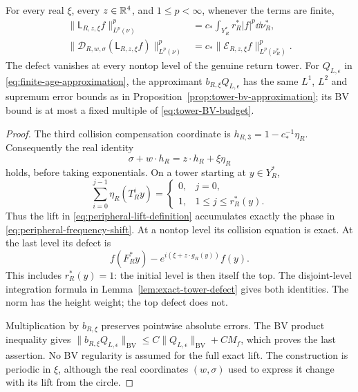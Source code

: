 \begin{lemma}
\label{lem:exact-peripheral-lift}
For every real $\xi$, every $z\in\mathbb R^4$, and $1\le p<\infty$,
whenever the terms are finite,
\begin{align}
 \|\mathsf L_{R,z,\xi}f\|_{L^p(\nu)}^p
     &=c_*\int_{Y_R^*}r_R^*|f|^p\dd\nu_R^*,
                      \label{eq:peripheral-lift-norm}\\
 \|\mathcal D_{R,w,\sigma}(\mathsf L_{R,z,\xi}f)\|_{L^p(\nu)}^p
     &=c_*\|\mathcal E_{R,z,\xi}f\|_{L^p(\nu_R^*)}^p.
                      \label{eq:peripheral-lift-defect}
\end{align}
The defect vanishes at every nontop level of the genuine return tower.
For $Q_{L,\epsilon}$ in \eqref{eq:finite-age-approximation}, the
approximant $b_{R,\xi}Q_{L,\epsilon}$ has the same $L^1$, $L^2$ and
supremum error bounds as in Proposition~\ref{prop:tower-bv-approximation};
its BV bound is at most a fixed multiple of
\eqref{eq:tower-BV-budget}.
\end{lemma}
\begin{proof}
The third collision compensation coordinate is
$h_{R,3}=1-c_*^{-1}\eta_R$. Consequently the real identity
\begin{equation}\label{eq:peripheral-frequency-shift}
 \sigma+w\cdot h_R=z\cdot h_R+\xi\eta_R
\end{equation}
holds, before taking exponentials. On a tower starting at $y\in Y_R^*$,
\[
 \sum_{i=0}^{j-1}\eta_R(T_R^iy)
       =\begin{cases}0,&j=0,\\1,&1\le j\le r_R^*(y).\end{cases}
\]
Thus the lift in \eqref{eq:peripheral-lift-definition} accumulates
exactly the phase in \eqref{eq:peripheral-frequency-shift}. At a
nontop level its collision equation is exact. At the last level its
defect is
\[
 f(F_R^*y)-e^{i(\xi+z\cdot g_R(y))}f(y).
\]
This includes $r_R^*(y)=1$: the initial level is then itself the top.
The disjoint-level integration formula in
Lemma~\ref{lem:exact-tower-defect} gives both identities. The norm
has the height weight; the top defect does not.

Multiplication by $b_{R,\xi}$ preserves pointwise absolute errors.
The BV product inequality gives
$\|b_{R,\xi}Q_{L,\epsilon}\|_{\mathrm{BV}}
 \le C\|Q_{L,\epsilon}\|_{\mathrm{BV}}+CM_f$,
which proves the last assertion. No BV regularity is assumed for the
full exact lift. The construction is periodic in $\xi$, although the
real coordinates $(w,\sigma)$ used to express it change with its lift
from the circle.
\end{proof}


